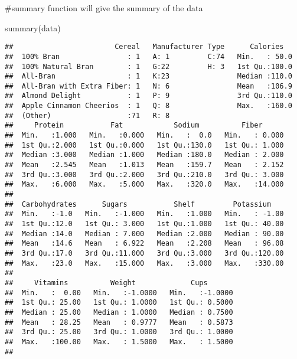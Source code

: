 \documentclass[]{article}
\newenvironment{Shaded}{\begin{snugshade}}{\end{snugshade}}
\newcommand{\FunctionTok}[1]{\textcolor[rgb]{0.00,0.00,0.00}{#1}}
\newcommand{\NormalTok}[1]{#1}
\begin{document}
\#summary function will give the summary of the data

\begin{Shaded}
\begin{Highlighting}[]
\FunctionTok{summary}\NormalTok{(data)}
\end{Highlighting}
\end{Shaded}

\begin{verbatim}
##                        Cereal   Manufacturer Type      Calories    
##  100% Bran                : 1   A: 1         C:74   Min.   : 50.0  
##  100% Natural Bran        : 1   G:22         H: 3   1st Qu.:100.0  
##  All-Bran                 : 1   K:23                Median :110.0  
##  All-Bran with Extra Fiber: 1   N: 6                Mean   :106.9  
##  Almond Delight           : 1   P: 9                3rd Qu.:110.0  
##  Apple Cinnamon Cheerios  : 1   Q: 8                Max.   :160.0  
##  (Other)                  :71   R: 8                               
##     Protein           Fat            Sodium          Fiber       
##  Min.   :1.000   Min.   :0.000   Min.   :  0.0   Min.   : 0.000  
##  1st Qu.:2.000   1st Qu.:0.000   1st Qu.:130.0   1st Qu.: 1.000  
##  Median :3.000   Median :1.000   Median :180.0   Median : 2.000  
##  Mean   :2.545   Mean   :1.013   Mean   :159.7   Mean   : 2.152  
##  3rd Qu.:3.000   3rd Qu.:2.000   3rd Qu.:210.0   3rd Qu.: 3.000  
##  Max.   :6.000   Max.   :5.000   Max.   :320.0   Max.   :14.000  
##                                                                  
##  Carbohydrates      Sugars           Shelf         Potassium     
##  Min.   :-1.0   Min.   :-1.000   Min.   :1.000   Min.   : -1.00  
##  1st Qu.:12.0   1st Qu.: 3.000   1st Qu.:1.000   1st Qu.: 40.00  
##  Median :14.0   Median : 7.000   Median :2.000   Median : 90.00  
##  Mean   :14.6   Mean   : 6.922   Mean   :2.208   Mean   : 96.08  
##  3rd Qu.:17.0   3rd Qu.:11.000   3rd Qu.:3.000   3rd Qu.:120.00  
##  Max.   :23.0   Max.   :15.000   Max.   :3.000   Max.   :330.00  
##                                                                  
##     Vitamins          Weight             Cups        
##  Min.   :  0.00   Min.   :-1.0000   Min.   :-1.0000  
##  1st Qu.: 25.00   1st Qu.: 1.0000   1st Qu.: 0.5000  
##  Median : 25.00   Median : 1.0000   Median : 0.7500  
##  Mean   : 28.25   Mean   : 0.9777   Mean   : 0.5873  
##  3rd Qu.: 25.00   3rd Qu.: 1.0000   3rd Qu.: 1.0000  
##  Max.   :100.00   Max.   : 1.5000   Max.   : 1.5000  
## 
\end{verbatim}
\end{document}
